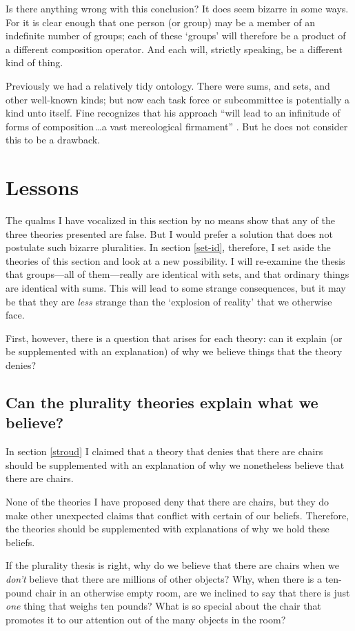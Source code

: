 \documentclass[11pt]{article}
\begin{document}
\begin{spacing}{1.5}
Is there anything wrong with this conclusion?  It does seem bizarre in
some ways.  For it is clear enough that one person (or group) may be a
member of an indefinite number of groups; each of these `groups' will
therefore be a product of a different composition operator.  And each
will, strictly speaking, be a different kind of thing.

Previously we had a relatively tidy ontology.  There were sums, and
sets, and other well-known kinds; but now each task force or
subcommittee is potentially a kind unto itself.  Fine recognizes that
his approach ``will lead to an infinitude of forms of
composition\,\ldots a vast mereological firmament''
\citeyearpar[576]{fine2010}.  But he does not consider this to be a
drawback.

\section{Lessons}
\label{lessons-p}
The qualms I have vocalized in this section by no means show that any
of the three theories presented are false.  But I would prefer a
solution that does not postulate such bizarre pluralities.  In section
\ref{set-id}, therefore, I set aside the theories of this section and
look at a new possibility.  I will re-examine the thesis that
groups---all of them---really are identical with sets, and that
ordinary things are identical with sums.  This will lead to some
strange consequences, but it may be that they are {\em less} strange
than the `explosion of reality' that we otherwise face.

First, however, there is a question that arises for each theory: can
it explain (or be supplemented with an explanation) of why we believe
things that the theory denies?

\subsection{Can the plurality theories explain what we believe?}
\label{explain-p}
In section \ref{stroud} I claimed that a theory that denies that there
are chairs should be supplemented with an explanation of why we
nonetheless believe that there are chairs.

None of the theories I have proposed deny that there are chairs, but
they do make other unexpected claims that conflict with certain of our
beliefs.  Therefore, the theories should be supplemented with
explanations of why we hold these beliefs.

If the plurality thesis is right, why do we believe that there are
chairs when we {\em don't} believe that there are millions of other
objects?  Why, when there is a ten-pound chair in an otherwise empty
room, are we inclined to say that there is just {\em one} thing that
weighs ten pounds?  What is so special about the chair that promotes
it to our attention out of the many objects in the room?


\end{spacing}
\end{document}
